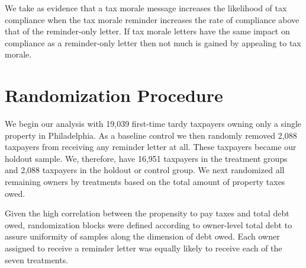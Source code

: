 \documentclass[12pt]{article}
\begin{document}
We take as evidence that a tax morale message increases the likelihood
of tax compliance when the tax morale reminder increases the rate of
compliance above that of the reminder-only letter.  If tax morale
letters have the same impact on compliance as a reminder-only letter
then not much is gained by appealing to tax morale.


\section{Randomization Procedure}

We begin our analysis with 19,039 first-time tardy taxpayers owning
only a single property in Philadelphia.  As a baseline control we then
randomly removed 2,088 taxpayers from receiving any reminder letter at
all.  These taxpayers became our holdout sample.  We, therefore, have
16,951 taxpayers in the treatment groups and 2,088 taxpayers in the
holdout or control group. We next randomized all remaining owners by
treatments based on the total amount of property taxes owed.

Given the high correlation between the propensity to pay taxes and
total debt owed, randomization blocks were defined according to
owner-level total debt to assure uniformity of samples along the
dimension of debt owed.  Each owner assigned to receive a reminder
letter was equally likely to receive each of the seven treatments.
\end{document}
